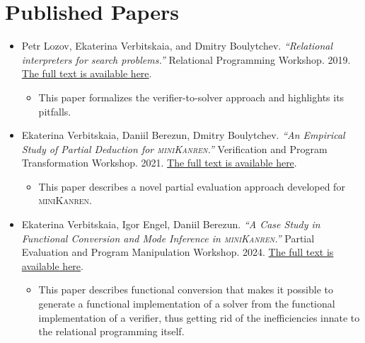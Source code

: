 \section{Published Papers}

\begin{itemize}
    \item Petr Lozov, Ekaterina Verbitskaia, and Dmitry Boulytchev. \emph{``Relational interpreters for search problems.''} Relational Programming Workshop. 2019. \href{https://dash.harvard.edu/bitstream/handle/1/41307116/tr-02-19.pdf?sequence=1&isAllowed=y#page=47}{The full text is available here}.
    \begin{itemize}
        \item This paper formalizes the verifier-to-solver approach and highlights its pitfalls. 
    \end{itemize}
    \item Ekaterina Verbitskaia, Daniil Berezun, Dmitry Boulytchev. \emph{``An Empirical Study of Partial Deduction for \textsc{miniKanren}.''} Verification and Program Transformation Workshop. 2021. \href{https://cgi.cse.unsw.edu.au/~eptcs/paper.cgi?VPT2021.5.pdf}{The full text is available here}. 
    \begin{itemize}
        \item This paper describes a novel partial evaluation approach developed for \textsc{miniKanren}. 
    \end{itemize}
    \item Ekaterina Verbitskaia, Igor Engel, Daniil Berezun. \emph{``A Case Study in Functional Conversion and Mode Inference in \textsc{miniKanren}.''}  Partial Evaluation and Program Manipulation Workshop. 2024. \href{https://web.archive.org/web/20240111175807id_/https://dl.acm.org/doi/pdf/10.1145/3635800.3636966}{The full text is available here}.
    \begin{itemize}
        \item This paper describes functional conversion that makes it possible to generate a functional implementation of a solver from the functional implementation of a verifier, thus getting rid of the inefficiencies innate to the relational programming itself.  
    \end{itemize}

% 
\end{itemize}


